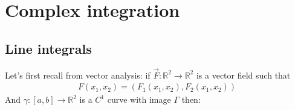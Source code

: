 \chapter{Complex integration}
\section{Line integrals}

Let's first recall from vector analysis: if $\vec{F}: \mathbb{R}^2 \to \mathbb{R}^{2}$ is a vector field such that
\begin{align*} 
	F\left(x_1, x_2\right) = \left(F_1\left(x_1, x_2\right), F_2\left(x_1, x_2\right)\right)
\end{align*}
And $\gamma : \left[a, b\right] \to \mathbb{R}^{2}$ is a $C^{1}$ curve with image $\Gamma$ then:

